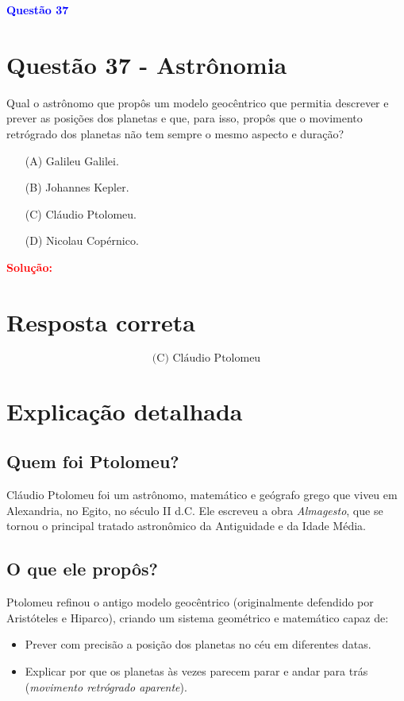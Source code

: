 \documentclass[a4paper,12pt]{article}
\begin{document}
\begin{flushleft}
\textbf{\textcolor{blue}{\Large Quest\~ao 37}}\\
\noindent
\section{Quest\~ao 37 - Astrônomia}
\colorbox{green!30}{Qual o astrônomo que propôs um modelo geocêntrico que
permitia descrever e prever} \colorbox{green!30}{as posições dos planetas e que, para isso, propôs que o movimento retrógrado dos planetas}
não tem sempre o mesmo aspecto e duração?

\begin{itemize}
\item[(A)] Galileu Galilei.
\item[(B)] Johannes Kepler.
\item[(C)] Cláudio Ptolomeu.
\item[(D)] Nicolau Copérnico.
\end{itemize}

\vspace{0.5cm}

\textcolor{red}{\textbf{Solução:}}\\

\section*{Resposta correta}

\[
\boxed{\text{(C) Cláudio Ptolomeu}}
\]

\section*{Explicação detalhada}

\subsection*{Quem foi Ptolomeu?}
Cláudio Ptolomeu foi um astrônomo, matemático e geógrafo grego que viveu em Alexandria, no Egito, no século II d.C. Ele escreveu a obra \textit{Almagesto}, que se tornou o principal tratado astronômico da Antiguidade e da Idade Média.

\subsection*{O que ele propôs?}
Ptolomeu refinou o antigo modelo geocêntrico (originalmente defendido por Aristóteles e Hiparco), criando um sistema geométrico e matemático capaz de:
\begin{itemize}
    \item Prever com precisão a posição dos planetas no céu em diferentes datas.
    \item Explicar por que os planetas às vezes parecem parar e andar para trás (\textit{movimento retrógrado aparente}).
\end{itemize}


\end{flushleft}
\end{document}

